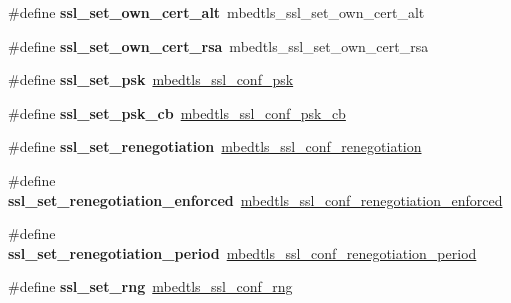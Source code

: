 \begin{DoxyCompactItemize}
\mbox{\label{compat-1_83_8h_a7b557aff29461a866f33de6af639354b}} 
\#define {\bfseries ssl\+\_\+set\+\_\+own\+\_\+cert\+\_\+alt}~mbedtls\+\_\+ssl\+\_\+set\+\_\+own\+\_\+cert\+\_\+alt
\item 
\mbox{\label{compat-1_83_8h_a343b623d24a41dd247f84f816d9e5cef}} 
\#define {\bfseries ssl\+\_\+set\+\_\+own\+\_\+cert\+\_\+rsa}~mbedtls\+\_\+ssl\+\_\+set\+\_\+own\+\_\+cert\+\_\+rsa
\item 
\mbox{\label{compat-1_83_8h_ada7daeb6114a4941e4b694168da9b328}} 
\#define {\bfseries ssl\+\_\+set\+\_\+psk}~\mbox{\hyperlink{ssl_8h_a1e185199e3ff613bdd1c8231a19e24fc}{mbedtls\+\_\+ssl\+\_\+conf\+\_\+psk}}
\item 
\mbox{\label{compat-1_83_8h_a83027e256a317ea96d65d57bd19d2546}} 
\#define {\bfseries ssl\+\_\+set\+\_\+psk\+\_\+cb}~\mbox{\hyperlink{ssl_8h_a1b804626a236e493316c58b048ab5937}{mbedtls\+\_\+ssl\+\_\+conf\+\_\+psk\+\_\+cb}}
\item 
\mbox{\label{compat-1_83_8h_a309f8b3a84ffb6833db1727b0a33f6f2}} 
\#define {\bfseries ssl\+\_\+set\+\_\+renegotiation}~\mbox{\hyperlink{ssl_8h_aad4f50fc1c0a018fd5eb18fd9621d0d3}{mbedtls\+\_\+ssl\+\_\+conf\+\_\+renegotiation}}
\item 
\mbox{\label{compat-1_83_8h_ad4715bb2675c7dbd734b4ec24190f867}} 
\#define {\bfseries ssl\+\_\+set\+\_\+renegotiation\+\_\+enforced}~\mbox{\hyperlink{ssl_8h_a2d193b15941a556baaf2cb94138d66df}{mbedtls\+\_\+ssl\+\_\+conf\+\_\+renegotiation\+\_\+enforced}}
\item 
\mbox{\label{compat-1_83_8h_adad47941365922046dc56d667c016c81}} 
\#define {\bfseries ssl\+\_\+set\+\_\+renegotiation\+\_\+period}~\mbox{\hyperlink{ssl_8h_a1785faa0640bd6190c1c17a94b408e31}{mbedtls\+\_\+ssl\+\_\+conf\+\_\+renegotiation\+\_\+period}}
\item 
\mbox{\label{compat-1_83_8h_aa9402497debe860c3395aa1f6f5f4db6}} 
\#define {\bfseries ssl\+\_\+set\+\_\+rng}~\mbox{\hyperlink{ssl_8h_a469cd1c64bbba4be22347bf8874a017e}{mbedtls\+\_\+ssl\+\_\+conf\+\_\+rng}}
\item 
\mbox{\label{compat-1_83_8h_ae1f82675d05d7d9b64ef8bca453ded77}} 

\end{DoxyCompactItemize}
